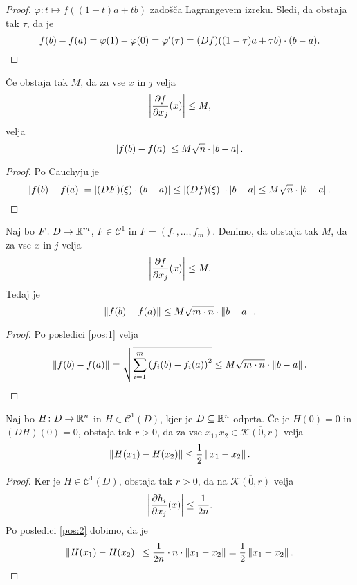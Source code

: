 \begin{proof}
$\varphi \colon t \mapsto f((1-t)a + tb)$ zadošča Lagrangevem
izreku. Sledi, da obstaja tak $\tau$, da je
\[
f(b) - f(a) =
\varphi(1) - \varphi(0) =
\varphi'(\tau) =
(Df)((1-\tau)a + \tau b) \cdot (b - a). \qedhere
\]
\end{proof}

\begin{posledica}\label{pos:1}
Če obstaja tak $M$, da za vse $x$ in $j$ velja
\[
\left\lvert \frac{\partial f}{\partial x_j}(x)\right\rvert \leq M,
\]
velja
\[
\left\lvert f(b) - f(a)\right\rvert \leq M \sqrt{n} \cdot \left\lvert b - a\right\rvert.
\]
\end{posledica}

\begin{proof}
Po Cauchyju je
\[
\left\lvert f(b) - f(a)\right\rvert =
\left\lvert (DF)(\xi) \cdot (b - a)\right\rvert \leq
\left\lvert (Df)(\xi)\right\rvert \cdot \left\lvert b - a\right\rvert \leq
M \sqrt{n} \cdot \left\lvert b - a\right\rvert. \qedhere
\]
\end{proof}

\begin{posledica}\label{pos:2}
Naj bo $F \colon D \to \mathbb{R}^m$, $F \in \mathcal{C}^1$ in
$F = (f_1, \dots, f_m)$. Denimo, da obstaja tak $M$, da za vse $x$
in $j$ velja
\[
\left\lvert \frac{\partial f}{\partial x_j}(x)\right\rvert \leq M.
\]
Tedaj je
\[
\left\lVert f(b) - f(a)\right\rVert \leq M \sqrt{m \cdot n} \cdot \left\lVert b - a\right\rVert.
\]
\end{posledica}

\begin{proof}
Po posledici \ref{pos:1} velja
\[
\left\lVert f(b) - f(a)\right\rVert =
\sqrt{\sum_{i=1}^m \left(f_i(b) - f_i(a)\right)^2} \leq
M \sqrt{m \cdot n} \cdot \left\lVert b - a\right\rVert. \qedhere
\]
\end{proof}

\begin{lema}\label{lm:1}
Naj bo $H \colon D \to \mathbb{R}^n$ in $H \in \mathcal{C}^1(D)$, kjer je
$D \subseteq \mathbb{R}^n$ odprta. Če je $H(0)=0$ in $(DH)(0)=0$, obstaja
tak $r>0$, da za vse $x_1, x_2 \in \overline{\mathcal{K}(0,r)}$
velja
\[
\left\lVert H(x_1) - H(x_2)\right\rVert \leq \frac{1}{2} \left\lVert x_1 - x_2\right\rVert.
\]
\end{lema}

\begin{proof}
Ker je $H \in \mathcal{C}^1(D)$, obstaja tak $r > 0$, da na
$\overline{\mathcal{K}(0,r)}$ velja
\[
\left\lvert \frac{\partial h_i}{\partial x_j}(x)\right\rvert \leq \frac{1}{2n}.
\]
Po posledici \ref{pos:2} dobimo, da je
\[
\left\lVert H(x_1) - H(x_2)\right\rVert \leq
\frac{1}{2n} \cdot n \cdot \left\lVert x_1 - x_2\right\rVert =
\frac{1}{2} \left\lVert x_1 - x_2\right\rVert. \qedhere
\]
\end{proof}

